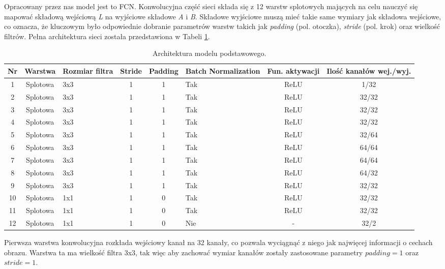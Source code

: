   Opracowany przez nas model jest to FCN. Konwolucyjna część sieci składa się
  z 12 warstw splotowych
  mających na celu nauczyć się mapować składową wejściową \textit{L} na wyjściowe
  składowe \textit{A} i \textit{B}. Składowe wyjściowe muszą mieć takie same
  wymiary jak składowa wejściowe, co oznacza, że kluczowym było odpowiednie dobranie
  parametrów warstw takich jak \textit{padding} (pol. otoczka), \textit{stride}
  (pol. krok) oraz wielkość filtrów. Pełna architektura sieci została przedstawiona w
  Tabeli \ref{table:model_architecture}.
  \noindent\begin{table}[H]
    \center
    \begin{tabular}{|c | c | m{3.3em} | c | c | m{4em} | c | c| }
     \hline
     Nr & Warstwa & Rozmiar filtra & Stride & Padding & Batch Normalization &
     Fun. aktywacji & Ilość kanałów wej./wyj. \\ [0.5ex]
    \hline
    1 & Splotowa & 3x3 & 1 & 1 & Tak & ReLU & 1/32 \\ \hline
    2 & Splotowa & 3x3 & 1 & 1 & Tak & ReLU & 32/32 \\ \hline
    3 & Splotowa & 3x3 & 1 & 1 & Tak & ReLU & 32/32 \\ \hline
    4 & Splotowa & 3x3 & 1 & 1 & Tak & ReLU & 32/32 \\ \hline
    5 & Splotowa & 3x3 & 1 & 1 & Tak & ReLU & 32/64 \\ \hline
    6 & Splotowa & 3x3 & 1 & 1 & Tak & ReLU & 64/64 \\ \hline
    7 & Splotowa & 3x3 & 1 & 1 & Tak & ReLU & 64/64 \\ \hline
    8 & Splotowa & 3x3 & 1 & 1 & Tak & ReLU & 64/32 \\ \hline
    9 & Splotowa & 3x3 & 1 & 1 & Tak & ReLU & 32/32 \\ \hline
    10 & Splotowa & 1x1 & 1 & 0 & Tak & ReLU & 32/32 \\ \hline
    11 & Splotowa & 1x1 & 1 & 0 & Tak & ReLU & 32/32 \\ \hline
    12 & Splotowa & 1x1 & 1 & 0 & Nie & - & 32/2 \\ \hline
    \end{tabular}
    \caption{Architektura modelu podstawowego.}
    \label{table:model_architecture}
  \end{table}
  Pierwsza warstwa konwolucyjna rozkłada wejściowy kanał na 32 kanały, co
  pozwala wyciągnąć z niego jak najwięcej informacji o cechach obrazu. Warstwa
  ta ma wielkość filtra 3x3, tak więc aby zachować wymiar kanałów zostały
  zastosowane parametry $\textit{padding}=1$ oraz $\textit{stride}=1$.

